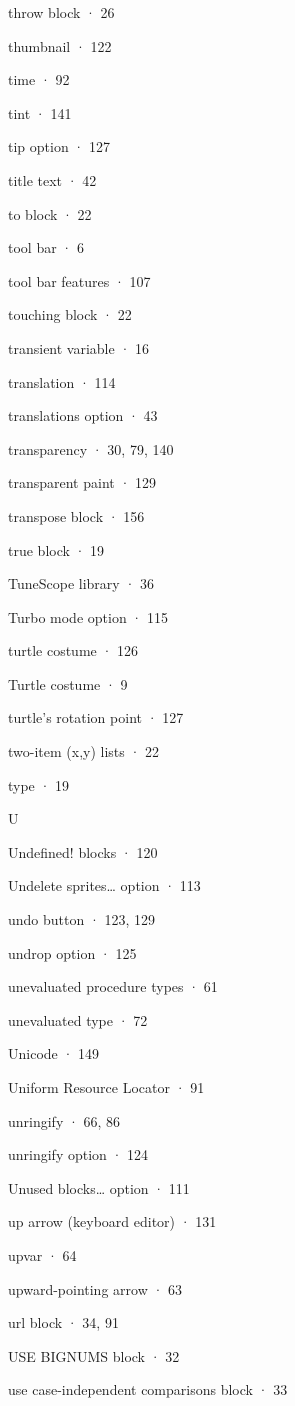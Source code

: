 throw block · 26

thumbnail · 122

time · 92

tint · 141

tip option · 127

title text · 42

to block · 22

tool bar · 6

tool bar features · 107

touching block · 22

transient variable · 16

translation · 114

translations option · 43

transparency · 30, 79, 140

transparent paint · 129

transpose block · 156

true block · 19

TuneScope library · 36

Turbo mode option · 115

turtle costume · 126

Turtle costume · 9

turtle's rotation point · 127

two-item (x,y) lists · 22

type · 19

U

Undefined! blocks · 120

Undelete sprites\ldots{} option · 113

undo button · 123, 129

undrop option · 125

unevaluated procedure types · 61

unevaluated type · 72

Unicode · 149

Uniform Resource Locator · 91

unringify · 66, 86

unringify option · 124

Unused blocks\ldots{} option · 111

up arrow (keyboard editor) · 131

upvar · 64

upward-pointing arrow · 63

url block · 34, 91

USE BIGNUMS block · 32

use case-independent comparisons block · 33

